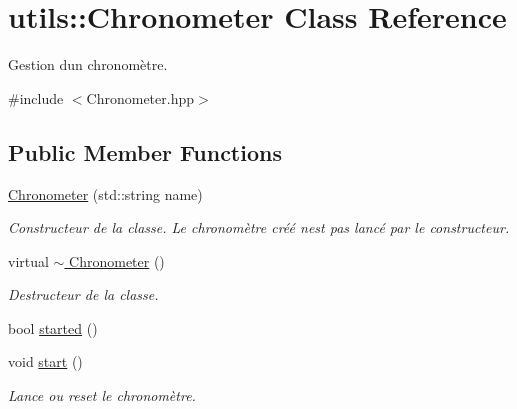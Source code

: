 \hypertarget{classutils_1_1Chronometer}{}\section{utils\+:\+:Chronometer Class Reference}
\label{classutils_1_1Chronometer}


Gestion d\textquotesingle{}un chronomètre.  




{\ttfamily \#include $<$Chronometer.\+hpp$>$}

\subsection*{Public Member Functions}
\begin{DoxyCompactItemize}
\item 
\mbox{\label{classutils_1_1Chronometer_a96be54a4bf5045e1b6f65ad092c23ded}} 
\hyperlink{classutils_1_1Chronometer_a96be54a4bf5045e1b6f65ad092c23ded}{Chronometer} (std\+::string name)
\begin{DoxyCompactList}\small\item\em Constructeur de la classe. Le chronomètre créé n\textquotesingle{}est pas lancé par le constructeur. \end{DoxyCompactList}\item 
\mbox{\label{classutils_1_1Chronometer_a4c03aa0beaf5d6f0f2e588fa97ed5298}} 
virtual \hyperlink{classutils_1_1Chronometer_a4c03aa0beaf5d6f0f2e588fa97ed5298}{$\sim$ Chronometer} ()
\begin{DoxyCompactList}\small\item\em Destructeur de la classe. \end{DoxyCompactList}\item 
bool \hyperlink{classutils_1_1Chronometer_af09b58a8ae28db72b09bca32efa3f95b}{started} ()
\item 
\mbox{\label{classutils_1_1Chronometer_a174c35f7b276290813fe913ed5c82bd3}} 
void \hyperlink{classutils_1_1Chronometer_a174c35f7b276290813fe913ed5c82bd3}{start} ()
\begin{DoxyCompactList}\small\item\em Lance ou reset le chronomètre. \end{DoxyCompactList}\item 

\end{DoxyCompactItemize}

